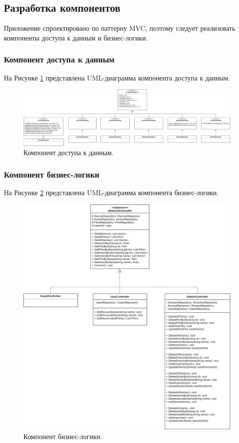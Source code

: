 \subsection{Разработка компонентов}
Приложение спроектировано по паттерну MVC, поэтому следует реализовать компоненты доступа к данным и бизнес-логики.

\subsubsection{Компонент доступа к данным}
На Рисунке \ref{img:AccessToDB} представлена UML-диаграмма компонента доступа к данным.
\begin{figure}[h!]
	\centering
	\includegraphics[scale=0.14]{img/AccessToDB.png}
	\caption{Компонент доступа к данным.}
	\label{img:AccessToDB}
\end{figure}

\subsubsection{Компонент бизнес-логики}
На Рисунке \ref{img:Controllers} представлена UML-диаграмма компонента бизнес-логики.
\begin{figure}[h!]
	\centering
	\includegraphics[scale=0.25]{img/Controllers.png}
	\caption{Компонент бизнес-логики.}
	\label{img:Controllers}
\end{figure}
\newpage
